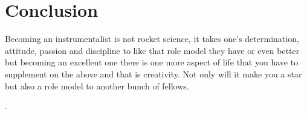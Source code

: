 \documentclass[14pt]{article}
\begin{document}
	\section{Conclusion}
\begin{Large}	

	Becoming an instrumentalist is not rocket science, it takes one’s determination, attitude, passion and discipline to like that role model they have or even better but becoming an excellent one there is one more aspect of life that you have to supplement on the above and that is creativity. Not only will it make you a star but also a role model to another bunch of fellows.
   \end{Large}.
\end{document}
